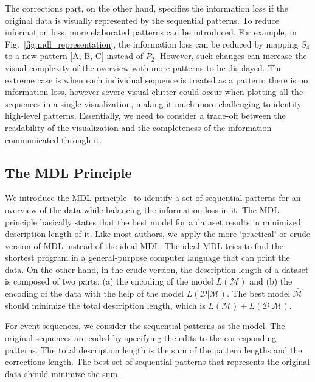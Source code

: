 The corrections part, on the other hand, specifies the information loss if the original data is visually represented by the sequential patterns. To reduce information loss, more elaborated patterns can be introduced. For example, in Fig.~\ref{fig:mdl_representation}, the information loss can be reduced by mapping $S_4$ to a new pattern [A, B, C] instead of $P_2$. However, such changes can increase the visual complexity of the overview with more patterns to be displayed. The extreme case is when each individual sequence is treated as a pattern: there is no information loss, however severe visual clutter could occur when plotting all the sequences in a single visualization, making it much more challenging to identify high-level patterns. Essentially, we need to consider a trade-off between the readability of the visualization and the completeness of the information communicated through it.

\subsection{The MDL Principle}

We introduce the MDL principle~\cite{grunwald2004tutorial, grunwald2007minimum} to identify a set of sequential patterns for an overview of the data while balancing the information loss in it.  The MDL principle basically states that the best model for a dataset results in minimized description length of it. Like most authors, we apply the more `practical' or crude version of MDL instead of the ideal MDL. The ideal MDL tries to find the shortest program in a general-purpose computer language that can print the data. On the other hand, in the crude version, the description length of a dataset is composed of two parts: (a) the encoding of the model $L(\mathscr{M})$ and (b) the encoding of the data with the help of the model $L(\mathscr{D}|\mathscr{M})$. The best model $\hat{\mathscr{M}}$ should minimize the total description length, which is $L(\mathscr{M}) + L(\mathscr{D}|\mathscr{M})$. 

For event sequences, we consider the sequential patterns as the model. The original sequences are coded by specifying the edits to the corresponding patterns. The total description length is the sum of the pattern lengths and the corrections length. The best set of sequential patterns that represents the original data should minimize the sum. 

